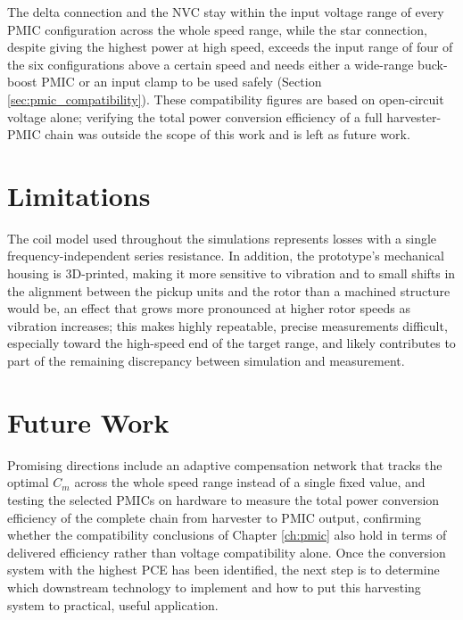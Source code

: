 The delta connection and the NVC stay within the input voltage range of every  PMIC configuration across the whole speed range, while the star connection, despite giving the highest power at high speed, exceeds the input range of four of the six configurations above a certain speed and needs either a wide-range buck-boost PMIC or an input clamp to be used safely (Section \ref{sec:pmic_compatibility}). These compatibility figures are based on open-circuit voltage alone; verifying the total power conversion efficiency of a full harvester-PMIC chain was outside the scope of this work and is left as future work.

\section{Limitations}
\label{sec:conclusions_limitations}

The coil model used throughout the simulations represents losses with a single frequency-independent series resistance. In addition, the prototype's mechanical housing is 3D-printed, making it more sensitive to vibration and to small shifts in the alignment between the pickup units and the rotor than a machined structure would be, an effect that grows more pronounced at higher rotor speeds as vibration increases; this makes highly repeatable, precise measurements difficult, especially toward the high-speed end of the target range, and likely contributes to part of the remaining discrepancy between simulation and measurement.

\section{Future Work}
\label{sec:conclusions_future}

Promising directions include an adaptive compensation network that tracks the optimal $C_m$ across the whole speed range instead of a single fixed value, and testing the selected PMICs on hardware to measure the total power conversion efficiency of the complete chain from harvester to PMIC output, confirming whether the compatibility conclusions of Chapter \ref{ch:pmic} also hold in terms of delivered efficiency rather than voltage compatibility alone. Once the conversion system with the highest PCE has been identified, the next step is to determine which downstream technology to implement and how to put this harvesting system to practical, useful application.
